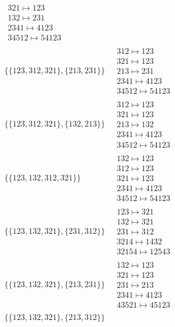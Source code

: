 \begin{scriptsize}
\begin{align}
\begin{matrix}
321 \mapsto 123
\\
132 \mapsto 231
\\
2341 \mapsto 4123
\\
34512 \mapsto 54123
\end{matrix}
\\
\{\{123, 312, 321\}, \{213, 231\}\}
\ 
&
\begin{matrix}
312 \mapsto 123
\\
321 \mapsto 123
\\
213 \mapsto 231
\\
2341 \mapsto 4123
\\
34512 \mapsto 54123
\end{matrix}
\\
\{\{123, 312, 321\}, \{132, 213\}\}
\ 
&
\begin{matrix}
312 \mapsto 123
\\
321 \mapsto 123
\\
213 \mapsto 132
\\
2341 \mapsto 4123
\\
34512 \mapsto 54123
\end{matrix}
\\
\{\{123, 132, 312, 321\}\}
\ 
&
\begin{matrix}
132 \mapsto 123
\\
312 \mapsto 123
\\
321 \mapsto 123
\\
2341 \mapsto 4123
\\
34512 \mapsto 54123
\end{matrix}
\\
\{\{123, 132, 321\}, \{231, 312\}\}
\ 
&
\begin{matrix}
123 \mapsto 321
\\
132 \mapsto 321
\\
231 \mapsto 312
\\
3214 \mapsto 1432
\\
32154 \mapsto 12543
\end{matrix}
\\
\{\{123, 132, 321\}, \{213, 231\}\}
\ 
&
\begin{matrix}
132 \mapsto 123
\\
321 \mapsto 123
\\
231 \mapsto 213
\\
2341 \mapsto 4123
\\
43521 \mapsto 45123
\end{matrix}
\\
\{\{123, 132, 321\}, \{213, 312\}\}
\ 
&
\begin{matrix}

\end{matrix}
\end{align}
\end{scriptsize}
